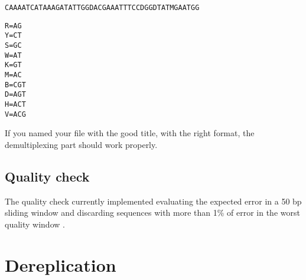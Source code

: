 \documentclass{article}\usepackage[]{graphicx}\usepackage[]{color}
\makeatletter
\newcommand{\hlstd}[1]{\textcolor[rgb]{0.345,0.345,0.345}{#1}}%
\newcommand{\hlkwb}[1]{\textcolor[rgb]{0.69,0.353,0.396}{#1}}%
\newenvironment{kframe}{%
 \def\at@end@of@kframe{}%
 \ifinner\ifhmode%
  \def\at@end@of@kframe{\end{minipage}}%
  \begin{minipage}{\columnwidth}%
 \fi\fi%
 \def\FrameCommand##1{\hskip\@totalleftmargin \hskip-\fboxsep
 \colorbox{shadecolor}{##1}\hskip-\fboxsep
     \hskip-\linewidth \hskip-\@totalleftmargin \hskip\columnwidth}%
 \MakeFramed {\advance\hsize-\width
   \@totalleftmargin\z@ \linewidth\hsize
   \@setminipage}}%
 {\par\unskip\endMakeFramed%
 \at@end@of@kframe}
\newenvironment{knitrout}{}{} %
\makeatother
\begin{document}
\begin{knitrout}
\color{fgcolor}\begin{kframe}
\begin{alltt}
CAAAATCATAAAGATATTGGDAC	GAAATTTCCDGGDTATMGAATGG
\end{alltt}
\end{kframe}
\end{knitrout}

\begin{knitrout}
\color{fgcolor}\begin{kframe}
\begin{alltt}
\hlstd{R} \hlkwb{=} \hlstd{AG}
\hlstd{Y} \hlkwb{=} \hlstd{CT}
\hlstd{S} \hlkwb{=} \hlstd{GC}
\hlstd{W} \hlkwb{=} \hlstd{AT}
\hlstd{K} \hlkwb{=} \hlstd{GT}
\hlstd{M} \hlkwb{=} \hlstd{AC}
\hlstd{B} \hlkwb{=} \hlstd{CGT}
\hlstd{D} \hlkwb{=} \hlstd{AGT}
\hlstd{H} \hlkwb{=} \hlstd{ACT}
\hlstd{V} \hlkwb{=} \hlstd{ACG}
\end{alltt}
\end{kframe}
\end{knitrout}

If you named your file with the good title, with the right format, the demultiplexing part should work properly.

\subsection{Quality check}
\label{subsec:qualcheck}

The quality check currently implemented evaluating the expected error in a 50 bp sliding window and discarding sequences with more than 1\% of error in the worst quality window \cite{DeVargas2015}.



\section{Dereplication}






\end{document}
